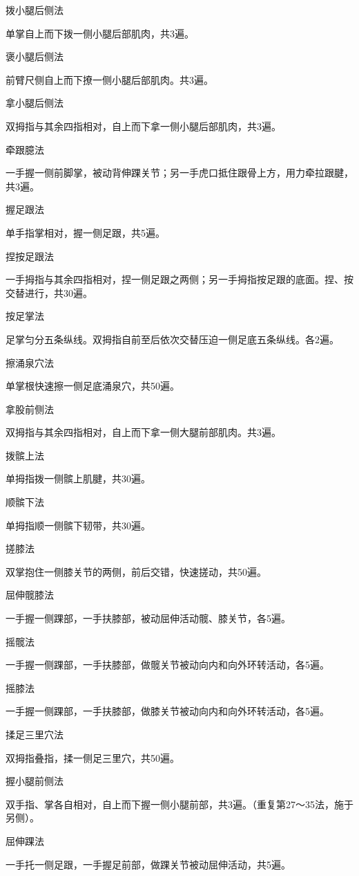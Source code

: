 \documentclass[12pt,UTF8]{ctexbook}
\begin{document}
拨小腿后侧法

单掌自上而下拨一侧小腿后部肌肉，共3遍。

褒小腿后侧法

前臂尺侧自上而下撩一侧小腿后部肌肉。共3遍。

拿小腿后侧法

双拇指与其余四指相对，自上而下拿一侧小腿后部肌肉，共3遍。

牵跟臆法

一手握一侧前脚掌，被动背伸踝关节；另一手虎口抵住跟骨上方，用力牵拉跟腱，共3遍。

握足跟法

单手指掌相对，握一侧足跟，共5遍。

捏按足跟法

一手拇指与其余四指相对，捏一侧足跟之两侧；另一手拇指按足跟的底面。捏、按交替进行，共30遍。

按足掌法

足掌匀分五条纵线。双拇指自前至后依次交替压迫一侧足底五条纵线。各2遍。

擦涌泉穴法

单掌根快速擦一侧足底涌泉穴，共50遍。

拿股前侧法

双拇指与其余四指相对，自上而下拿一侧大腿前部肌肉。共3遍。

拨髌上法

单拇指拨一侧髌上肌腱，共30遍。

顺髌下法

单拇指顺一侧髌下韧带，共30遍。

搓膝法

双掌抱住一侧膝关节的两侧，前后交错，快速搓动，共50遍。

屈伸髋膝法

一手握一侧踝部，一手扶膝部，被动屈伸活动髋、膝关节，各5遍。

摇髋法

一手握一侧踝部，一手扶膝部，做髋关节被动向内和向外环转活动，各5遍。

摇膝法

一手握一侧踝部，一手扶膝部，做膝关节被动向内和向外环转活动，各5遍。

揉足三里穴法

双拇指叠指，揉一侧足三里穴，共50遍。

握小腿前侧法

双手指、掌各自相对，自上而下握一侧小腿前部，共3遍。（重复第27～35法，施于另侧）。

屈伸踝法

一手托一侧足跟，一手握足前部，做踝关节被动屈伸活动，共5遍。
\end{document}
